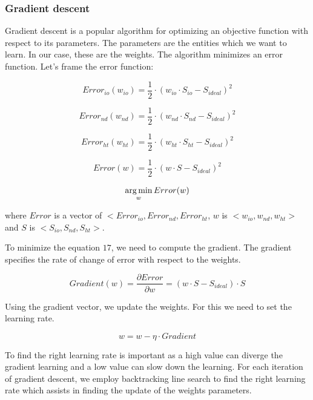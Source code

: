 \subsubsection{Gradient descent}
Gradient descent is a popular algorithm for optimizing an objective function with respect to its parameters. The parameters are the entities which we want to learn. In our case, these are the weights. The algorithm minimizes an error function. Let's frame the error function:

\begin{equation}
Error_{io}(w_{io}) = \frac{1}{2} \cdot (w_{io} \cdot S_{io} - S_{ideal}) ^ 2
\end{equation}

\begin{equation}
Error_{nd}(w_{nd}) = \frac{1}{2} \cdot (w_{nd} \cdot S_{nd} - S_{ideal}) ^ 2
\end{equation}

\begin{equation}
Error_{ht}(w_{ht}) = \frac{1}{2} \cdot (w_{ht} \cdot S_{ht} - S_{ideal}) ^ 2
\end{equation}

\begin{equation}
Error(w) = \frac{1}{2} \cdot (w \cdot S - S_{ideal}) ^ 2
\end{equation}

\begin{equation}
\operatorname*{arg\,min}_w Error(w) 
\end{equation} 

where $Error$ is a vector of $<Error_{io}, Error_{nd}, Error_{ht}$,
$w$ is $<w_{io}, w_{nd}, w_{ht}>$ and $S$ is $<S_{io}, S_{nd}, S_{ht}>$.

To minimize the equation $17$, we need to compute the gradient. The gradient specifies the rate of change of error with respect to the weights.

\begin{equation}
Gradient(w) = \frac{\partial Error}{\partial w} = (w \cdot S - S_{ideal}) \cdot S
\end{equation}

Using the gradient vector, we update the weights. For this we need to set the learning rate.

\begin{equation}
w = w - \eta \cdot {Gradient}
\end{equation}

To find the right learning rate is important as a high value can diverge the gradient learning and a low value can slow down the learning. For each iteration of gradient descent, we employ backtracking line search to find the right learning rate which assists in finding the update of the weights parameters.

